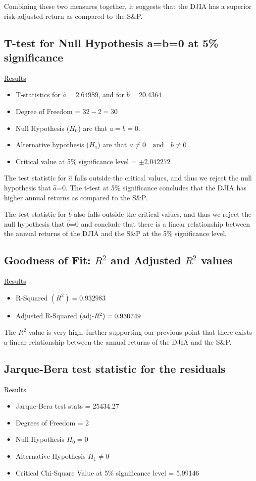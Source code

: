 \documentclass[a4paper]{article}
\begin{document}
	Combining these two measures together, it suggests that the DJIA has a superior risk-adjusted return as compared to the S\&P. 
	
	
	\subsection{T-test for Null Hypothesis a=b=0 at 5\% significance}
	\underline{Results}
	\begin{itemize}[nosep]
		\item T-statistics for $\hat{a} = 2.64989$, and for $\hat{b} = 20.4364$
		\item Degree of Freedom = $32 - 2 = 30$
		\item Null Hypothesis ($H_0$) are that $a=b=0$.
		\item Alternative hypothesis ($H_1$) are that $a\ne 0 \quad \textnormal{and} \quad b\ne 0$
		\item Critical value at 5\% significance level = $\pm2.042272$
	\end{itemize}

    The test statistic for $\hat{a}$ falls outside the critical values, and thus we reject the null hypothesis that $\hat{a}$=0. The t-test at 5\% significance concludes that the DJIA has higher annual returns as compared to the S\&P.  
    
    The test statistic for $\hat{b}$ also falls outside the critical values, and thus we reject the null hypothesis that $\hat{b}$=0 and conclude that there is a linear relationship between the annual returns of the DJIA and the S\&P at the 5\% significance level.

	\subsection{Goodness of Fit: $R^2$ and Adjusted $R^2$ values}
	\underline{Results}
	\begin{itemize}[nosep]
		\item R-Squared $(R^2) = 0.932983$
		\item Adjusted R-Squared $(\textnormal{adj-}R^2) = 0.930749$
	\end{itemize}

     The $R^2$ value is very high, further supporting our previous point that there exists a linear relationship between the annual returns of the DJIA and the S\&P.
	
	\subsection{Jarque-Bera test statistic for the residuals}
	\underline{Results}
	\begin{itemize}[nosep]
		\item Jarque-Bera test stats = 25434.27
		\item Degrees of Freedom = 2
		\item Null Hypothesis $H_0 = 0$
		\item Alternative Hypothesis $H_1 \ne 0$
		\item Critical Chi-Square Value at 5\% significance level = 5.99146
	\end{itemize}
	
\end{document}
